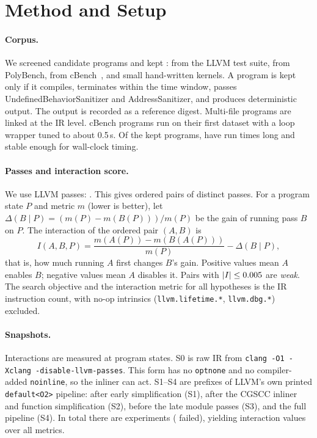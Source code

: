 \section{Method and Setup}
\label{sec:method}

\paragraph{Corpus.}
We screened \NCandidates{} candidate programs and kept \NPrograms{}:
\NTestSuite{} from the LLVM test suite, \NPolyBench{} from PolyBench, \NCBench{} from
cBench~\cite{milepost}, and \NOwn{} small hand-written kernels. A program is kept only if it
compiles, terminates within the time window, passes UndefinedBehaviorSanitizer and
AddressSanitizer, and produces deterministic output. The output is recorded as a reference digest.
Multi-file programs are linked at the IR level. cBench programs run on their first dataset with a
loop wrapper tuned to about 0.5\,s. Of the kept programs, \NRuntimeReliable{} have run times long
and stable enough for wall-clock timing.

\paragraph{Passes and interaction score.}
We use \NPasses{} LLVM passes: \PassList{}. This gives \NPairs{} ordered pairs of distinct passes.
For a program state $P$ and metric $m$ (lower is better), let
$\Delta(B \mid P) = (m(P) - m(B(P)))/m(P)$ be the gain of running pass $B$ on $P$. The
interaction of the ordered pair $(A,B)$ is
\[ I(A,B,P) = \frac{m(A(P)) - m(B(A(P)))}{m(P)} - \Delta(B \mid P), \]
that is, how much running $A$ first changes $B$'s gain. Positive values mean $A$ enables $B$;
negative values mean $A$ disables it. Pairs with $|I| \le 0.005$ are \emph{weak}. The search
objective and the interaction metric for all hypotheses is the IR instruction count, with no-op
intrinsics (\texttt{llvm.lifetime.*}, \texttt{llvm.dbg.*}) excluded.

\paragraph{Snapshots.}
Interactions are measured at \NSnapshots{} program states. S0 is raw IR from
\texttt{clang -O1 -Xclang -disable-llvm-passes}. This form has no \texttt{optnone} and no
compiler-added \texttt{noinline}, so the inliner can act. S1--S4 are prefixes of LLVM's own
printed \texttt{default<O2>} pipeline: after early simplification (S1), after the CGSCC
inliner and function simplification (S2), before the late module passes (S3), and the full
pipeline (S4). In total there are \NExperiments{} experiments (\NExpFailed{} failed), yielding
\NInteractionRows{} interaction values over all metrics.

